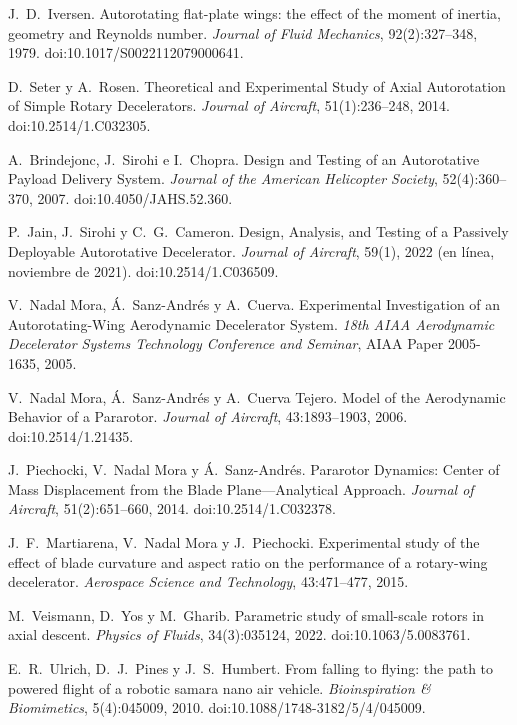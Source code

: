  J.~D.~Iversen. Autorotating flat-plate wings: the effect
  of the moment of inertia, geometry and Reynolds number. \emph{Journal of Fluid
  Mechanics}, 92(2):327--348, 1979. doi:10.1017/S0022112079000641.

 D.~Seter y A.~Rosen. Theoretical and Experimental Study of
  Axial Autorotation of Simple Rotary Decelerators. \emph{Journal of Aircraft},
  51(1):236--248, 2014. doi:10.2514/1.C032305.

 A.~Brindejonc, J.~Sirohi e I.~Chopra. Design and
  Testing of an Autorotative Payload Delivery System. \emph{Journal of the American
  Helicopter Society}, 52(4):360--370, 2007. doi:10.4050/JAHS.52.360.

 P.~Jain, J.~Sirohi y C.~G.~Cameron. Design, Analysis, and
  Testing of a Passively Deployable Autorotative Decelerator. \emph{Journal of Aircraft},
  59(1), 2022 (en línea, noviembre de 2021). doi:10.2514/1.C036509.

 V.~Nadal Mora, Á.~Sanz-Andrés y A.~Cuerva. Experimental
  Investigation of an Autorotating-Wing Aerodynamic Decelerator System. \emph{18th AIAA
  Aerodynamic Decelerator Systems Technology Conference and Seminar}, AIAA Paper
  2005-1635, 2005.

 V.~Nadal Mora, Á.~Sanz-Andrés y A.~Cuerva Tejero. Model of
  the Aerodynamic Behavior of a Pararotor. \emph{Journal of Aircraft}, 43:1893--1903, 2006.
  doi:10.2514/1.21435.

 J.~Piechocki, V.~Nadal Mora y Á.~Sanz-Andrés. Pararotor
  Dynamics: Center of Mass Displacement from the Blade Plane---Analytical Approach.
  \emph{Journal of Aircraft}, 51(2):651--660, 2014. doi:10.2514/1.C032378.

 J.~F.~Martiarena, V.~Nadal Mora y J.~Piechocki.
  Experimental study of the effect of blade curvature and aspect ratio on the performance
  of a rotary-wing decelerator. \emph{Aerospace Science and Technology}, 43:471--477,
  2015.

 M.~Veismann, D.~Yos y M.~Gharib. Parametric study of
  small-scale rotors in axial descent. \emph{Physics of Fluids}, 34(3):035124, 2022. doi:10.1063/5.0083761.

 E.~R.~Ulrich, D.~J.~Pines y J.~S.~Humbert. From falling
  to flying: the path to powered flight of a robotic samara nano air vehicle.
  \emph{Bioinspiration \& Biomimetics}, 5(4):045009, 2010.
  doi:10.1088/1748-3182/5/4/045009.

